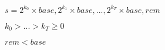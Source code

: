 \documentclass{article}
\begin{document}
$s = {2^{k_0} \times base, 2^{k_1} \times base, ..., 2^{k_T} \times base, rem}$
\pagebreak

$k_0 > ... > k_T \geq 0$
\pagebreak

$rem < base$
\pagebreak
\end{document}
